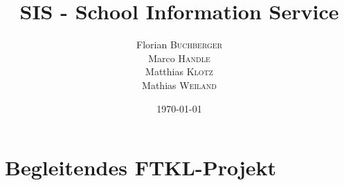 \documentclass[12pt, oneside, titlepage, a4paper]{book}
\title{SIS - School Information Service}
\author{
Florian \textsc{Buchberger} \\
Marco \textsc{Handle} \\
Matthias \textsc{Klotz} \\
Mathias \textsc{Weiland}}
\date{\today}
\begin{document}
\frontmatter

\maketitle


\newpage

\tableofcontents



\mainmatter




\appendix 
%
%

\chapter{Begleitendes FTKL-Projekt}
\label{sec:report}









\listoffigures
\lstlistoflistings
\listoftables

\backmatter 
\end{document}
